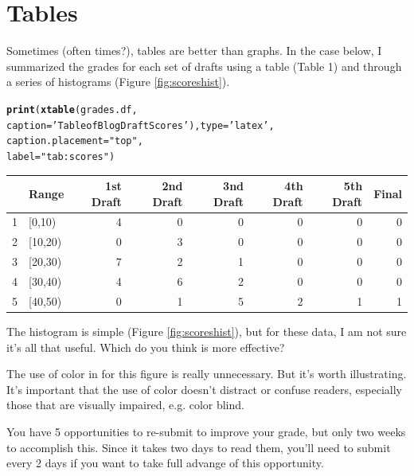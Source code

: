 \documentclass{article}\usepackage[]{graphicx}\usepackage[]{color}
\makeatletter
\newcommand{\hlstr}[1]{\textcolor[rgb]{0.192,0.494,0.8}{#1}}%
\newcommand{\hlstd}[1]{\textcolor[rgb]{0.345,0.345,0.345}{#1}}%
\newcommand{\hlkwc}[1]{\textcolor[rgb]{0.333,0.667,0.333}{#1}}%
\newcommand{\hlkwd}[1]{\textcolor[rgb]{0.737,0.353,0.396}{\textbf{#1}}}%
\newenvironment{kframe}{%
 \def\at@end@of@kframe{}%
 \ifinner\ifhmode%
  \def\at@end@of@kframe{\end{minipage}}%
  \begin{minipage}{\columnwidth}%
 \fi\fi%
 \def\FrameCommand##1{\hskip\@totalleftmargin \hskip-\fboxsep
 \colorbox{shadecolor}{##1}\hskip-\fboxsep
     \hskip-\linewidth \hskip-\@totalleftmargin \hskip\columnwidth}%
 \MakeFramed {\advance\hsize-\width
   \@totalleftmargin\z@ \linewidth\hsize
   \@setminipage}}%
 {\par\unskip\endMakeFramed%
 \at@end@of@kframe}
\makeatother
\begin{document}
\section{Tables}

Sometimes (often times?), tables are better than graphs. In the case below, I summarized the grades for each set of drafts using a table (Table 1) and through a series of histograms (Figure \ref{fig:scoreshist}). 




\begin{kframe}
\begin{alltt}
\hlkwd{print}\hlstd{(}\hlkwd{xtable}\hlstd{(grades.df,}
      \hlkwc{caption}\hlstd{=}\hlstr{'Table of Blog Draft Scores'}\hlstd{),} \hlkwc{type}\hlstd{=}\hlstr{'latex'}\hlstd{,}
      \hlkwc{caption.placement} \hlstd{=} \hlstr{"top"}\hlstd{,}
      \hlkwc{label}\hlstd{=}\hlstr{"tab:scores"}\hlstd{)}
\end{alltt}
\end{kframe}%
% 
\begin{tabular}{rlrrrrrr}
  \hline
 & Range & 1st Draft & 2nd Draft & 3nd Draft & 4th Draft & 5th Draft & Final \\ 
  \hline
1 & [0,10) &   4 &   0 &   0 &   0 &   0 &   0 \\ 
  2 & [10,20) &   0 &   3 &   0 &   0 &   0 &   0 \\ 
  3 & [20,30) &   7 &   2 &   1 &   0 &   0 &   0 \\ 
  4 & [30,40) &   4 &   6 &   2 &   0 &   0 &   0 \\ 
  5 & [40,50) &   0 &   1 &   5 &   2 &   1 &   1 \\ 
   \hline
\end{tabular}


\bigskip

The histogram is simple (Figure \ref{fig:scoreshist}), but for these data, I am not sure it's all that useful. Which do you think is more effective? 

The use of color in for this figure is really unnecessary. But it's worth illustrating. It's important that the use of color doesn't distract or confuse readers, especially those that are visually impaired, e.g. color blind.

\bigskip

You have 5 opportunities to re-submit to improve your grade, but only two weeks to accomplish this. Since it takes two days to read them, you'll need to submit every 2 days if you want to take full advange of this opportunity. 
\end{document}
